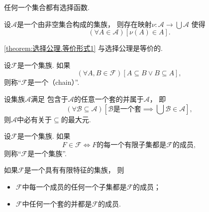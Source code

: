 \begin{axiom}
任何一个集合都有选择函数.
\end{axiom}

\begin{theorem}\label{theorem:选择公理.等价形式1}
设\(\mathscr{A}\)是一个由非空集合构成的集族，
则存在映射\(\nu\colon \mathscr{A} \to \bigcup \mathscr{A}\)
使得\[
	(\forall A \in \mathscr{A})
	[\nu(A) \in A].
\]
\end{theorem}
\cref{theorem:选择公理.等价形式1} 与选择公理是等价的.%

\begin{definition}
设\(\mathscr{F}\)是一个集族.
如果\[
	(\forall A,B\in\mathscr{F})
	[A \subseteq B \lor B \subseteq A],
\]
则称“\(\mathscr{F}\)是一个（chain）”.
\end{definition}

\begin{theorem}[佐恩引理]
设集族\(\mathscr{A}\)满足
包含于\(\mathscr{A}\)的任意一个套的并属于\(\mathscr{A}\)，
即\[
	(\forall \mathscr{B} \subseteq \mathscr{A})
	\left[ \text{$\mathscr{B}$是一个套} \implies \bigcup \mathscr{B} \in \mathscr{A} \right],
\]
则\(\mathscr{A}\)中必有关于\(\subseteq\)的最大元.
\end{theorem}

\begin{definition}
设\(\mathscr{F}\)是一个集族.
如果\[
	F \in \mathscr{F}
	\iff
	\text{$F$的每一个有限子集都是$\mathscr{F}$的成员},
\]
则称“\(\mathscr{F}\)是一个集族”.
\end{definition}

\begin{lemma}
如果\(\mathscr{F}\)是一个具有有限特征的集族，
则\begin{itemize}
	\item \(\mathscr{F}\)中每一个成员的任何一个子集都是\(\mathscr{F}\)的成员；
	\item \(\mathscr{F}\)中任何一个套的并都是\(\mathscr{F}\)的成员.
\end{itemize}
\end{lemma}

